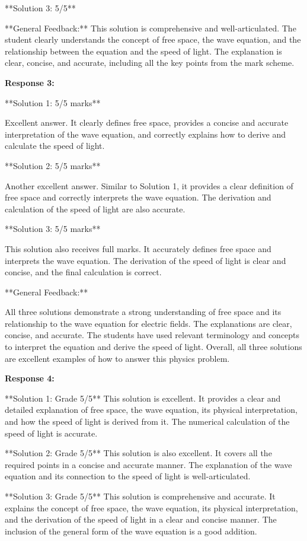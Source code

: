 \documentclass[a4paper,11pt]{article}
\begin{document}
**Solution 3: 5/5**

**General Feedback:** This solution is comprehensive and well-articulated. The student clearly understands the concept of free space, the wave equation, and the relationship between the equation and the speed of light. The explanation is clear, concise, and accurate, including all the key points from the mark scheme.

\textbf{Response 3:}

**Solution 1: 5/5 marks**

Excellent answer. It clearly defines free space, provides a concise and accurate interpretation of the wave equation, and correctly explains how to derive and calculate the speed of light.

**Solution 2: 5/5 marks**

Another excellent answer. Similar to Solution 1, it provides a clear definition of free space and correctly interprets the wave equation. The derivation and calculation of the speed of light are also accurate.

**Solution 3: 5/5 marks**

This solution also receives full marks. It accurately defines free space and interprets the wave equation. The derivation of the speed of light is clear and concise, and the final calculation is correct.

**General Feedback:**

All three solutions demonstrate a strong understanding of free space and its relationship to the wave equation for electric fields. The explanations are clear, concise, and accurate. The students have used relevant terminology and concepts to interpret the equation and derive the speed of light. Overall, all three solutions are excellent examples of how to answer this physics problem.

\textbf{Response 4:}

**Solution 1: Grade 5/5**
This solution is excellent. It provides a clear and detailed explanation of free space, the wave equation, its physical interpretation, and how the speed of light is derived from it. The numerical calculation of the speed of light is accurate.

**Solution 2: Grade 5/5**
This solution is also excellent. It covers all the required points in a concise and accurate manner. The explanation of the wave equation and its connection to the speed of light is well-articulated.

**Solution 3: Grade 5/5**
This solution is comprehensive and accurate. It explains the concept of free space, the wave equation, its physical interpretation, and the derivation of the speed of light in a clear and concise manner. The inclusion of the general form of the wave equation is a good addition.
\end{document}
